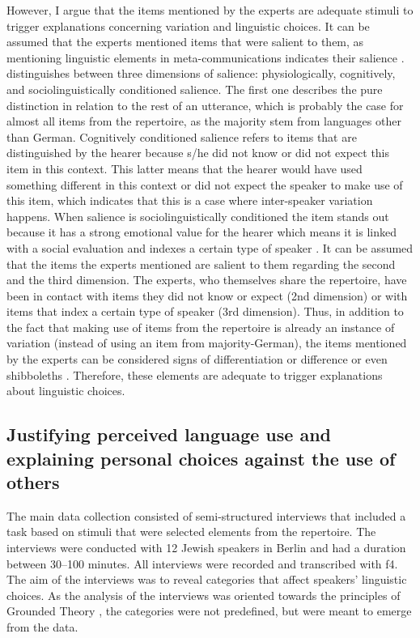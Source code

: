 \documentclass[output=paper]{langscibook}
\begin{document}
However, I argue that the items mentioned by the experts are adequate stimuli to trigger explanations concerning variation and linguistic choices. It can be assumed that the experts mentioned items that were salient to them, as mentioning linguistic elements in meta-communications indicates their salience \citep[96]{Lenz2010}. \citet{Auer2014} distinguishes between three dimensions of salience: physiologically, cognitively, and sociolinguistically conditioned salience. The first one describes the pure distinction in relation to the rest of an utterance, which is probably the case for almost all items from the repertoire, as the majority stem from languages other than German. Cognitively conditioned salience refers to items that are distinguished by the hearer because s/he did not know or did not expect this item in this context. This latter means that the hearer would have used something different in this context or did not expect the speaker to make use of this item, which indicates that this is a case where inter-speaker variation happens. When salience is sociolinguistically conditioned the item stands out because it has a strong emotional value for the hearer which means it is linked with a social evaluation and indexes a certain type of speaker \citep[9--10]{Auer2014}. It can be assumed that the items the experts mentioned are salient to them regarding the second and the third dimension. The experts, who themselves share the repertoire, have been in contact with items they did not know or expect (2nd dimension) or with items that index a certain type of speaker (3rd dimension). Thus, in addition to the fact that making use of items from the repertoire is already an instance of variation (instead of using an item from majority-German), the items mentioned by the experts can be considered signs of differentiation or difference \citep{GalIrvine2019} or even shibboleths \citep{BuschSpitzmüller2021}. Therefore, these elements are adequate to trigger explanations about linguistic choices.

\subsection{Justifying perceived language use and explaining personal choices against the use of others}

The main data collection consisted of semi-structured interviews that included a task based on stimuli that were selected elements from the repertoire. The interviews were conducted with 12 Jewish speakers in Berlin and had a duration between 30--100 minutes. All interviews were recorded and transcribed with f4. The aim of the interviews was to reveal categories that affect speakers’ linguistic choices. As the analysis of the interviews was oriented towards the principles of Grounded Theory \citep{Charmaz2010}, the categories were not predefined, but were meant to emerge from the data.
\end{document}
